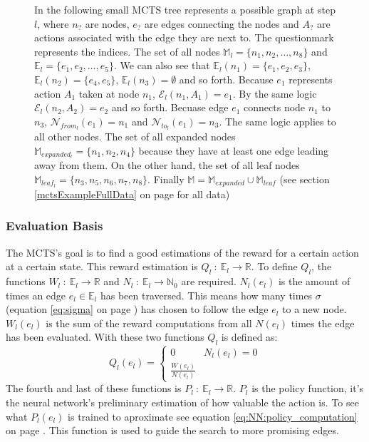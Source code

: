 \documentclass[12pt]{article}
\newcommand{\equationref}[1]{equation \ref{#1} on page \pageref{#1}}
\newcommand{\sectionref}[1]{section \ref{#1} on page \pageref{#1}}
\begin{document}
\begin{figure}[H]
  \centering
  
  \captionsetup{width=.9\linewidth}
  \caption{In the following small MCTS tree represents a possible graph at step \(l\), where \(n_?\) are nodes, \(e_?\) are edges connecting the nodes and \(A_?\) are actions associated with the edge they are next to. The questionmark represents the indices. The set of all nodes \(\mathbb M_l = \{n_1, n_2, \dots, n_8\}\) and \(\mathbb E_l = \{e_1, e_2, \dots, e_5\}\). We can also see that \(\mathbb E_l(n_1) = \{e_1, e_2, e_3\}\), \(\mathbb E_l(n_2) = \{e_4, e_5\}\), \(\mathbb E_l(n_3) = \emptyset\) and so forth. Because \(e_1\) represents action \(A_1\) taken at node \(n_1\), \(\mathcal E_l(n_1, A_1) = e_1\). By the same logic \(\mathcal E_l(n_2, A_2) = e_2\) and so forth. Becuase edge \(e_1\) connects node \(n_1\) to \(n_3\), \(\mathcal N_{from_l}(e_1) = n_1\) and \(\mathcal N_{to_l}(e_1) = n_3\). The same logic applies to all other nodes. The set of all expanded nodes \(\mathbb M_{expanded_l} = \{n_1, n_2, n_4\}\) because they have at least one edge leading away from them. On the other hand, the set of all leaf nodes \(\mathbb M_{leaf_l}  = \{n_3, n_5, n_6, n_7, n_8\}\). Finally \(\mathbb M = \mathbb M_{expanded} \cup \mathbb M_{leaf}\)
(see \sectionref{mctsExampleFullData} for all data)}
	\label{fig:mcts:example}
\end{figure}

\subsubsection{Evaluation Basis}
The MCTS's goal is to find a good estimations of the reward for a certain action at a certain state. This reward estimation is \(Q_l~:~\mathbb{E}_{l}\to \mathbb{R}\). To define \(Q_l\), the functions \(W_l~:~\mathbb{E}_{l}\to\mathbb{R}\) and \(N_l~:~\mathbb{E}_{l}\to\mathbb{N}_0\) are required. \(N_l(e_l)\) is the amount of times an edge \(e_l\in\mathbb{E}_{l}\) has been traversed. This means how many times \(\sigma\) (\equationref{eq:sigma}) has chosen to follow the edge \(e_l\) to a new node. \(W_l(e_l)\) is the sum of the reward computations from all \(N(e_l)\) times the edge has been evaluated. With these two functions \(Q_l\) is defined as:
\begin{equation}
Q_l(e_l) = 
\begin{cases}
0 & N_l(e_l) = 0\\
\frac{W(e_l)}{N(e_l)} &
\end{cases}
\end{equation}
The fourth and last of these functions is \(P_l~:~\mathbb{E}_{l}\to\mathbb{R}\). \(P_l\) is the policy function, it's the neural network's preliminary estimation of how valuable the action is. To see what \(P_l(e_l)\) is trained to aproximate see \equationref{eq:NN:policy_computation}.
This function is used to guide the search to more promising edges.
\end{document}
